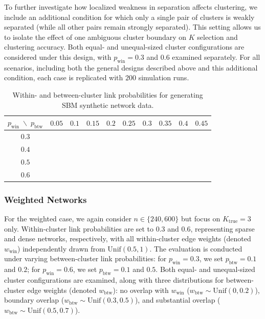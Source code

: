 \documentclass[12pt, titlepage, reqno]{article}
\begin{document}
To further investigate how localized weakness in separation affects 
clustering, we include an additional condition for which only a 
single pair of clusters is weakly separated (while all other pairs 
remain strongly separated). This setting allows us to isolate the 
effect of one ambiguous cluster boundary on $K$ selection and 
clustering accuracy. Both equal- and unequal-sized cluster 
configurations are considered under this design, with $p_\text{win} = 
0.3$ and $0.6$ examined separately. For all scenarios, including both 
the general designs described above and this additional condition, 
each case is replicated with $200$ simulation runs.


\begin{table}[tbp]
\centering
\renewcommand{\arraystretch}{1.2}
\caption{Within- and between-cluster link probabilities for 
	generating SBM synthetic network data.}
\label{tab:sbm_unweighted_prob}
\setlength{\tabcolsep}{12pt}
\begin{tabular}{c ccccccccc}
	\toprule
	\textbf{$p_{\text{win}} \; \backslash \; 
		p_{\text{btw}}$} & $0.05$ & $0.1$ & $0.15$ & $0.2$ & $0.25$ & 
		$0.3$ & $0.35$ & $0.4$ & $0.45$ \\
	\midrule
	$0.3$ & \checkmark & \checkmark & \checkmark & & & & & & \\
	$0.4$ & & \checkmark & \checkmark  & \checkmark & \checkmark & & 
	& & \\
	$0.5$ & & \checkmark & \checkmark & \checkmark & \checkmark & 
	\checkmark & \checkmark & & \\
	$0.6$ & & \checkmark & \checkmark & \checkmark & \checkmark & 
	\checkmark & \checkmark & \checkmark & \checkmark \\
	\bottomrule
\end{tabular}
\end{table}

\subsubsection{Weighted Networks}
\label{sec:weighted}


For the weighted case, we again consider $n \in \{240,600\}$ but 
focus on $K_\text{true} = 3$ only. Within-cluster link 
probabilities are set to $0.3$ and $0.6$, representing sparse and 
dense networks, respectively, with all within-cluster edge weights 
(denoted $w_\text{win}$) independently drawn from $\text{Unif}(0.5, 
1)$. The evaluation is conducted under varying between-cluster link 
probabilities: for $p_\text{win} = 0.3$, we set $p_\text{btw} = 0.1$ 
and $0.2$; for $p_\text{win} = 0.6$, we set $p_\text{btw} = 0.1$ and 
$0.5$. Both equal- and unequal-sized cluster configurations are 
examined, along with three distributions for between-cluster edge 
weights (denoted $w_\text{btw}$): no overlap with $w_\text{win}$ 
($w_\text{btw} \sim \text{Unif}(0,0.2)$), boundary overlap 
($w_\text{btw} \sim \text{Unif}(0.3,0.5)$), and substantial overlap 
($w_\text{btw} \sim \text{Unif}(0.5,0.7)$).
\end{document}
